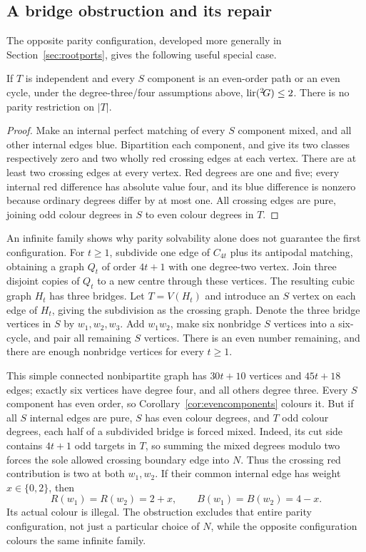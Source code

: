\subsection{A bridge obstruction and its repair}

The opposite parity configuration, developed more generally in
Section~\ref{sec:rootports}, gives the following useful special case.

\begin{corollary}
\label{cor:evencomponents}
If $T$ is independent and every $S$ component is an even-order path or
an even cycle, under the degree-three/four assumptions above,
$\operatorname{lir}({}^{2}\!G)\le2$. There is no parity restriction on $|T|$.
\end{corollary}
\begin{proof}
Make an internal perfect matching of every $S$ component mixed, and
all other internal edges blue. Bipartition each component, and give its
two classes respectively zero and two wholly red crossing edges at each
vertex. There are at least two crossing edges at every vertex. Red
degrees are one and five; every internal red difference has absolute
value four, and its blue difference is nonzero because ordinary
degrees differ by at most one. All crossing edges are pure, joining
odd colour degrees in $S$ to even colour degrees in $T$.
\end{proof}

An infinite family shows why parity solvability alone does not guarantee
the first configuration. For $t\ge1$, subdivide one edge of
$C_{4t}$ plus its antipodal matching, obtaining a graph $Q_t$ of order
$4t+1$ with one degree-two vertex. Join three disjoint copies of $Q_t$
to a new centre through these vertices. The resulting cubic graph $H_t$
has three bridges. Let $T=V(H_t)$ and introduce an $S$ vertex on each
edge of $H_t$, giving the subdivision as the crossing graph. Denote the
three bridge vertices in $S$ by $w_1,w_2,w_3$. Add $w_1w_2$, make six
nonbridge $S$ vertices into a six-cycle, and pair all remaining $S$
vertices. There is an even number remaining, and there are enough
nonbridge vertices for every $t\ge1$.

This simple connected nonbipartite graph has $30t+10$ vertices and
$45t+18$ edges; exactly six vertices have degree four, and all others
degree three. Every $S$ component has even order, so
Corollary~\ref{cor:evencomponents} colours it. But if all $S$ internal
edges are pure, $S$ has even colour degrees, and $T$ odd colour degrees,
each half of a subdivided bridge is forced mixed. Indeed, its cut side
contains $4t+1$ odd targets in $T$, so summing the mixed degrees modulo
two forces the sole allowed crossing boundary edge into $N$. Thus the
crossing red contribution is two at both $w_1,w_2$. If their common
internal edge has weight $x\in\{0,2\}$, then
\[
 R(w_1)=R(w_2)=2+x,\qquad B(w_1)=B(w_2)=4-x.
\]
Its actual colour is illegal. The obstruction excludes that entire
parity configuration, not just a particular choice of $N$, while the
opposite configuration colours the same infinite family.

